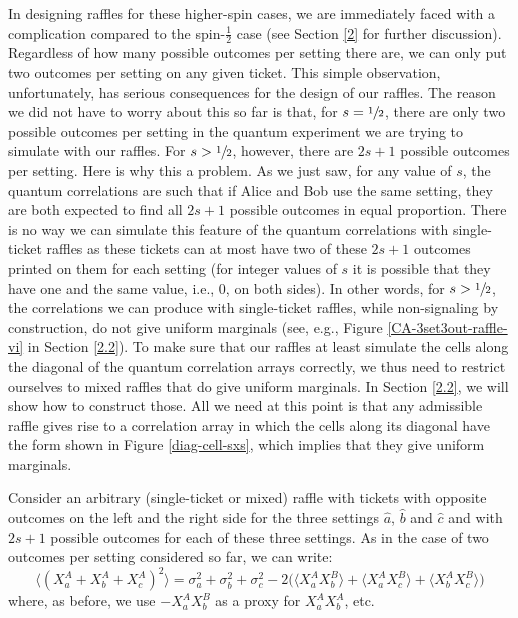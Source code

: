 In designing raffles for these higher-spin cases, we are immediately faced with a complication compared to the spin-$\frac12$ case (see Section \ref{2} for further discussion). Regardless of how many possible outcomes per setting there are, we can only put two outcomes per setting on any given ticket. This simple observation, unfortunately, has serious consequences for the design of our raffles. The reason we did not have to worry about this so far is that, for $s = \sfrac12$, there are only two possible outcomes per setting in the quantum experiment we are trying to simulate with our raffles. For $s > \sfrac12$, however, there are $2s+1$ possible outcomes per setting. Here is why this a problem. As we just saw, for any value of $s$, the quantum correlations are such that if Alice and Bob use the same setting, they are both expected to find all $2s+1$ possible outcomes in equal proportion. There is no way we can simulate this feature of the quantum correlations with single-ticket raffles as these tickets can at most have two of these $2s+1$ outcomes printed on them for each setting  (for integer values of $s$ it is possible that they have one and the same value, i.e., $0$, on both sides). In other words, for $s > \sfrac12$, the correlations we can produce with single-ticket raffles, while non-signaling by construction, do not give uniform marginals (see, e.g., Figure \ref{CA-3set3out-raffle-vi} in Section \ref{2.2}). To make sure that our raffles at least simulate the cells along the diagonal of the quantum correlation arrays correctly, we thus need to restrict ourselves to mixed raffles that do give uniform marginals. In Section \ref{2.2}, we will show how to construct those. All we need at this point is that any admissible raffle gives rise to a correlation array in which the cells along its diagonal have the form shown in Figure \ref{diag-cell-sxs}, which implies that they give uniform marginals.

Consider an arbitrary (single-ticket or mixed) raffle with tickets with opposite outcomes on the left and the right side for the three settings $\hat{a}$, $\hat{b}$ and $\hat{c}$ and with $2s \! + \! 1$ possible outcomes for each of these three settings. As in the case of two outcomes per setting considered so far, we can write:
\begin{equation}
\langle \left( X_a^A + X_b^A + X_c^A \right)^2 \rangle
= \sigma_a^2 + \sigma_b^2 + \sigma_c^2 - 2 \big( \langle X_a^A X_b^B \rangle + \langle X_a^A X_c^B \rangle + \langle X_b^A X_c^B \rangle \big)
\label{sum of X sq 4 any raffle}
\end{equation}
where, as before, we use $-X_a^A X_b^B$ as a proxy for $X_a^A X_b^A$, etc. 

